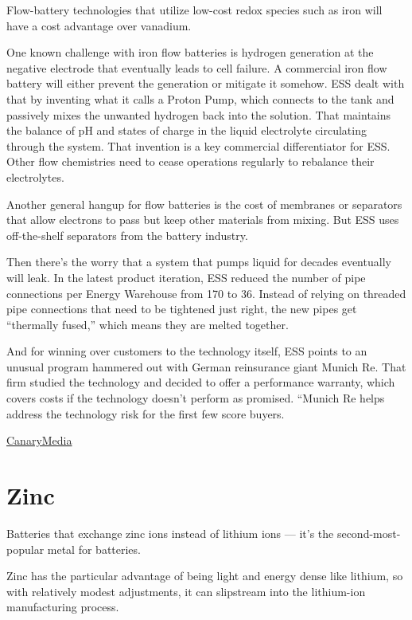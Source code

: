 \documentclass[
]{book}
\begin{document}
Flow-battery technologies that utilize low-cost redox species such as iron will have a cost advantage over vanadium.

One known challenge with iron flow batteries is hydrogen generation at the negative electrode that eventually leads to cell failure.
A commercial iron flow battery will either prevent the generation or mitigate it somehow.
ESS dealt with that by inventing what it calls a Proton Pump, which connects to the tank and passively mixes the unwanted hydrogen back into the solution. That maintains the balance of pH and states of charge in the liquid electrolyte circulating through the system.
That invention is a key commercial differentiator for ESS.
Other flow chemistries need to cease operations regularly to rebalance their electrolytes.

Another general hangup for flow batteries is the cost of membranes or separators that allow electrons to pass but keep other materials from mixing. But ESS uses off-the-shelf separators from the battery industry.

Then there's the worry that a system that pumps liquid for decades eventually will leak.
In the latest product iteration, ESS reduced the number of pipe connections per Energy Warehouse from 170 to 36. Instead of relying on threaded pipe connections that need to be tightened just right, the new pipes get ``thermally fused,'' which means they are melted together.

And for winning over customers to the technology itself, ESS points to an unusual program hammered out with German reinsurance giant Munich Re. That firm studied the technology and decided to offer a performance warranty, which covers costs if the technology doesn't perform as promised.
``Munich Re helps address the technology risk for the first few score buyers.

\href{https://www.canarymedia.com/articles/ess-is-betting-the-world-is-ready-for-a-billion-dollar-battery-disrupter/}{CanaryMedia}

\hypertarget{zinc}{%
\section{Zinc}\label{zinc}}

Batteries that exchange zinc ions instead of lithium ions --- it's the second-most-popular metal for batteries.

Zinc has the particular advantage of being light and energy dense like lithium, so with relatively modest adjustments, it can slipstream into the lithium-ion manufacturing process.
\end{document}
